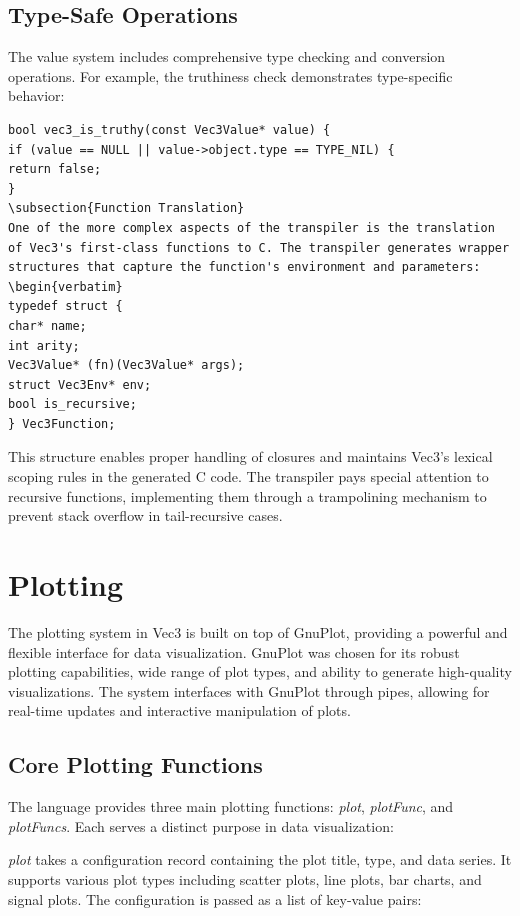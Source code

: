 \subsection{Type-Safe Operations}
The value system includes comprehensive type checking and conversion operations. For example, the truthiness check demonstrates type-specific behavior:
\begin{verbatim}
bool vec3_is_truthy(const Vec3Value* value) {
if (value == NULL || value->object.type == TYPE_NIL) {
return false;
}
\subsection{Function Translation}
One of the more complex aspects of the transpiler is the translation of Vec3's first-class functions to C. The transpiler generates wrapper structures that capture the function's environment and parameters:
\begin{verbatim}
typedef struct {
char* name;
int arity;
Vec3Value* (fn)(Vec3Value* args);
struct Vec3Env* env;
bool is_recursive;
} Vec3Function;
\end{verbatim}
This structure enables proper handling of closures and maintains Vec3's lexical scoping rules in the generated C code. 
The transpiler pays special attention to recursive functions, implementing them through a trampolining mechanism to prevent stack overflow in tail-recursive cases.
\section{Plotting}\label{sec:plotting}

The plotting system in Vec3 is built on top of GnuPlot, providing a powerful and flexible interface for data visualization. GnuPlot was chosen for its robust plotting capabilities, wide range of plot types, and ability to generate high-quality visualizations. The system interfaces with GnuPlot through pipes, allowing for real-time updates and interactive manipulation of plots.

\subsection{Core Plotting Functions}\label{subsec:core-plotting-functions}

The language provides three main plotting functions: \textit{plot}, \textit{plotFunc}, and \textit{plotFuncs}. Each serves a distinct purpose in data visualization:

\textit{plot} takes a configuration record containing the plot title, type, and data series. It supports various plot types including scatter plots, line plots, bar charts, and signal plots. The configuration is passed as a list of key-value pairs:

